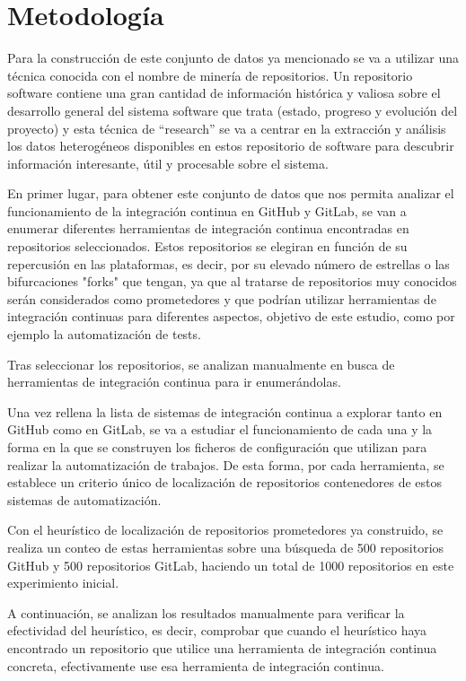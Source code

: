 \section{Metodología}

Para la construcción de este conjunto de datos ya mencionado se va a utilizar una técnica conocida con el nombre de minería de repositorios.
Un repositorio software contiene una gran cantidad de información histórica y valiosa sobre el desarrollo general del sistema software que trata (estado, progreso y evolución del proyecto) y esta técnica de “research” se va a centrar en la extracción y análisis los datos heterogéneos disponibles en estos repositorio de software para descubrir información interesante, útil y procesable sobre el sistema.

En primer lugar, para obtener este conjunto de datos que nos permita analizar el funcionamiento de la integración continua en GitHub y GitLab, se van a enumerar diferentes herramientas de integración continua encontradas en repositorios seleccionados. 
Estos repositorios se elegiran en función de su repercusión en las plataformas, es decir, por su elevado número de estrellas o las bifurcaciones "forks" que tengan, ya que al tratarse de repositorios muy conocidos serán considerados como prometedores y que podrían utilizar herramientas de integración continuas para diferentes aspectos, objetivo de este estudio, como por ejemplo la automatización de tests.

Tras seleccionar los repositorios, se analizan manualmente en busca de herramientas de integración continua para ir enumerándolas.

Una vez rellena la lista de sistemas de integración continua a explorar tanto en GitHub como en GitLab, se va a estudiar el funcionamiento de cada una y la forma en la que se construyen los ficheros de configuración que utilizan para realizar la automatización de trabajos. De esta forma, por cada herramienta, se establece un criterio único de localización de repositorios contenedores de estos sistemas de automatización.

Con el heurístico de localización de repositorios prometedores ya construido, se realiza un conteo de estas herramientas sobre una búsqueda de 500 repositorios GitHub y 500 repositorios GitLab, haciendo un total de 1000 repositorios en este experimiento inicial.

A continuación, se analizan los resultados manualmente para verificar la efectividad del heurístico, es decir, comprobar que cuando el heurístico haya encontrado un repositorio que utilice una herramienta de integración continua concreta, efectivamente use esa herramienta de integración continua.


